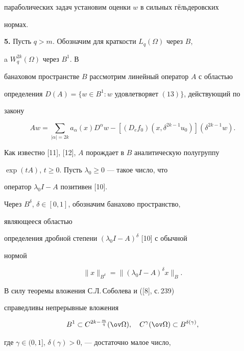параболических задач установим оценки $w$ в сильных г\"ельдеровских 


нормах. 


\medskip 


 


{\bf 5.} Пусть $q>m$. Обозначим для краткости $L_q(\Omega)$ через $B$, 


a $W^{2k}_q(\Omega)$ через $B^1$. В 


банаховом пространстве $B$ рассмотрим линейный оператор $A$ с областью 


определения $D(A)=\{w\in B^1:w$ удовлетворяет $(13)\}$, действующий по 


закону 


$$ 


A w=\sum_{|\alpha|=2k}a_\alpha(x)D^\alpha w- 


[(D_e f_0)(x,\delta^{2k-1}u_0)](\delta^{2k-1}w). 


$$ 


 


Как известно [11], [12], $A$ порождает в $B$ аналитическую полугруппу  


$\exp(t A)$, $t\ge0$. Пусть $\lambda_0\ge0$ --- такое число, что 


оператор $\lambda_0I-A$ позитивен [10]. 


Через $B^\delta$, $\delta\in[0,1]$, обозначим банахово пространство, 


являющееся областью  


определения дробной степени $(\lambda_0I-A)^\delta$ [10] с обычной 


нормой 


$$ 


\|x\|_{B^\delta}=\|(\lambda_0I-A)^\delta x\|_B. 


$$ 


В силу теоремы вложения С.Л.\,Соболева и ([8], с.\,239)


справедливы непрерывные вложения


\begin{equation} 


B^1\subset C^{2k-\frac{m}{q}}(\ov\Omega),\quad 


C^\gamma(\ov\Omega)\subset B^{\delta(\gamma)}, 


\end{equation} 


где $\gamma\in(0,1]$, $\delta(\gamma)>0$, --- достаточно малое число, 


